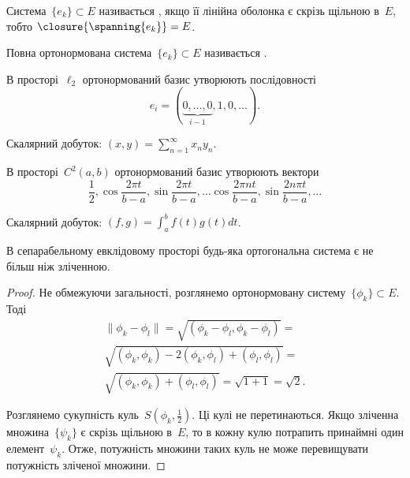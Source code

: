 \begin{definition}
Система~$\{e_k\} \subset E$ називається ,
якщо її лінійна оболонка є скрізь щільною в~$E$, тобто
$\closure{\spanning \{e_k\}} = E$.
\end{definition}

\begin{definition}
Повна ортонормована система~$\{e_k\} \subset E$
називається .
\end{definition}

\begin{example}
В просторі~$\ell_2$ ортонормований базис
утворюють послідовності
\begin{equation*}
    e_i = (\underset{i - 1}{\underbrace{0, \dots, 0}}, 1, 0, \dots).
\end{equation*}

Скалярний добуток: $(x, y) = \sum_{n = 1}^\infty x_n y_n$.
\end{example}

\begin{example}  %
В просторі~$C^2(a, b)$ ортонормований
базис утворюють вектори
\begin{equation*}
    \frac{1}{2}, \cos \frac{2 \pi t}{b - a}, \sin \frac{2 \pi t}{b - a}, \dots
    \cos \frac{2 \pi n t}{b - a}, \sin \frac{2 n \pi t}{b - a}, \dots
\end{equation*}

Скалярний добуток: $(f, g) = \int_a^b f(t) g (t) dt$.
\end{example}

\begin{lemma}
В сепарабельному евклідовому просторі будь-яка
ортогональна система є не більш ніж зліченною.
\end{lemma}

\begin{proof}
Не обмежуючи загальності, розглянемо
ортонормовану систему~$\{\phi_k\} \subset E$. Тоді
\begin{multline*}
    \|\phi_k - \phi_l\| =
    \sqrt{(\phi_k - \phi_l, \phi_k - \phi_l)} = \\
    \sqrt{(\phi_k, \phi_k) - 2 (\phi_k, \phi_l) + (\phi_l, \phi_l)} = \\
    \sqrt{(\phi_k, \phi_k) + (\phi_l, \phi_l)} =
    \sqrt{1 + 1} = \sqrt{2}.
\end{multline*}

Розглянемо сукупність куль~$S\left( \phi_k, \frac{1}{2} \right)$.
Ці кулі не перетинаються. Якщо зліченна множина~$\{\psi_k\}$ є скрізь
щільною в~$E$, то в кожну кулю потрапить принаймні один
елемент~$\psi_k$. Отже, потужність множини таких куль не
може перевищувати потужність зліченої множини. 
\end{proof}

